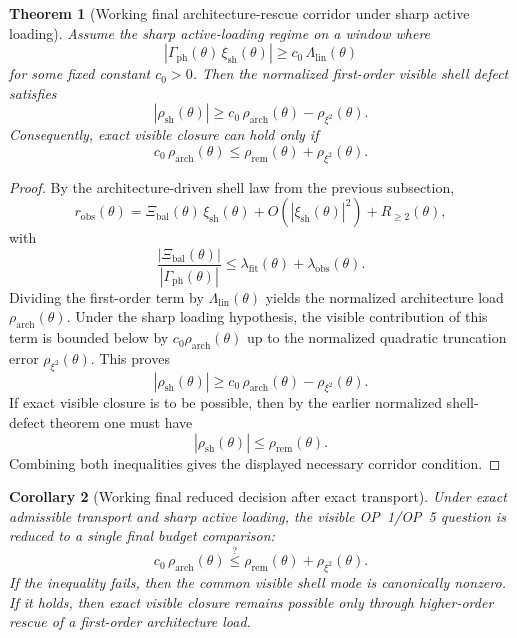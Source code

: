 \documentclass[12pt,a4paper]{article}
\newtheorem{theorem}{Theorem}[section]
\newtheorem{corollary}[theorem]{Corollary}
\begin{document}
\begin{theorem}[Working final architecture-rescue corridor under sharp active loading]
Assume the sharp active-loading regime on a window where
\[
 |\Gamma_{\mathrm{ph}}(\theta)\,\xi_{\mathrm{sh}}(\theta)|
 \ge c_0\,\Lambda_{\mathrm{lin}}(\theta)
\]
for some fixed constant \(c_0>0\). Then the normalized first-order visible shell defect satisfies
\[
 |\rho_{\mathrm{sh}}(\theta)|
 \ge c_0\,\rho_{\mathrm{arch}}(\theta)-\rho_{\xi^2}(\theta).
\]
Consequently, exact visible closure can hold only if
\[
 c_0\,\rho_{\mathrm{arch}}(\theta)
 \le
 \rho_{\mathrm{rem}}(\theta)+\rho_{\xi^2}(\theta).
\]
\end{theorem}

\begin{proof}
By the architecture-driven shell law from the previous subsection,
\[
 r_{\mathrm{obs}}(\theta)
 =
 \Xi_{\mathrm{bal}}(\theta)\,\xi_{\mathrm{sh}}(\theta)
 + O\!\left(|\xi_{\mathrm{sh}}(\theta)|^2\right)
 + R_{\ge 2}(\theta),
\]
with
\[
 \frac{|\Xi_{\mathrm{bal}}(\theta)|}{|\Gamma_{\mathrm{ph}}(\theta)|}
 \le
 \lambda_{\mathrm{fit}}(\theta)+\lambda_{\mathrm{obs}}(\theta).
\]
Dividing the first-order term by \(\Lambda_{\mathrm{lin}}(\theta)\) yields the normalized architecture load \(\rho_{\mathrm{arch}}(\theta)\). Under the sharp loading hypothesis, the visible contribution of this term is bounded below by \(c_0\rho_{\mathrm{arch}}(\theta)\) up to the normalized quadratic truncation error \(\rho_{\xi^2}(\theta)\). This proves
\[
 |\rho_{\mathrm{sh}}(\theta)|
 \ge c_0\,\rho_{\mathrm{arch}}(\theta)-\rho_{\xi^2}(\theta).
\]
If exact visible closure is to be possible, then by the earlier normalized shell-defect theorem one must have
\[
 |\rho_{\mathrm{sh}}(\theta)|\le \rho_{\mathrm{rem}}(\theta).
\]
Combining both inequalities gives the displayed necessary corridor condition.
\end{proof}

\begin{corollary}[Working final reduced decision after exact transport]
Under exact admissible transport and sharp active loading, the visible OP~1/OP~5 question is reduced to a single final budget comparison:
\[
 c_0\,\rho_{\mathrm{arch}}(\theta)
 \stackrel{?}{\le}
 \rho_{\mathrm{rem}}(\theta)+\rho_{\xi^2}(\theta).
\]
If the inequality fails, then the common visible shell mode is canonically nonzero. If it holds, then exact visible closure remains possible only through higher-order rescue of a first-order architecture load.
\end{corollary}
\end{document}
